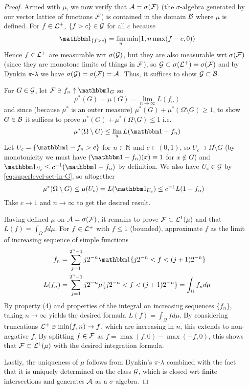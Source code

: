 \begin{proof}
  Armed with $\mu$, we now verify that $\mathcal{A} = \sigma(\mathcal{F})$ (the
  $\sigma$-algebra generated by our vector lattice of functions $\mathcal{F}$)
  is contained in the domain $\mathcal{B}$ where $\mu$ is defined.
  For $f \in \mathcal{L}^+$, $\{f > c\} \in \mathcal{G}$ for all $c$ because
  \begin{align}
    \label{eq:superlevel-set-in-G}
    \ind_{\{f > c\}} = \lim_n \min(1, n \max(f - c, 0))
  \end{align}
  Hence $f \in \mathcal{L}^+$ are measurable wrt $\sigma(\mathcal{G})$, but they are also
  measurable wrt $\sigma(\mathcal{F})$ (since they are monotone limits of things in
  $\mathcal{F}$), so $\mathcal{G} \subset \sigma(\mathcal{L}^+) = \sigma(\mathcal{F})$ and by Dynkin
  $\pi$-$\lambda$ we have $\sigma(\mathcal{G}) = \sigma(\mathcal{F}) = \mathcal{A}$. Thus, it suffices
  to show $\mathcal{G} \subset \mathcal{B}$.

  For $G \in \mathcal{G}$, let $\cF \ni f_n \uparrow \ind_{G}$ so
  \[
    \mu^*(G) = \mu(G) = \lim_{n \to \infty} L(f_n)
  \]
  and since (because $\mu^*$ is an outer measure)
  $\mu^*(G) + \mu^*(\Omega \setminus G) \geq 1$, to show
  $G \in \mathcal{B}$ it suffices to prove $\mu^*(G) + \mu^*(\Omega \setminus G) \leq 1$
  i.e.
  \[
    \mu^*(\Omega \setminus G) \leq \lim_n L(\ind - f_n)
  \]
  Let $U_c = \{\ind - f_n > c\}$ for $n \in \mathbb{N}$ and $c \in (0,1)$,
  so $U_c \supset \Omega \setminus G$
  (by monotonicity we must have $(\ind - f_n)(x) \equiv 1$ for $x \not\in G$)
  and $\ind_{U_c} \leq c^{-1}(\ind - f_n)$ by definition.
  We also have $U_c \in \mathcal{G}$ by \cref{eq:superlevel-set-in-G},
  so altogether
  \begin{align*}
    \mu^*(\Omega \setminus G) \leq \mu(U_c) &= L(\ind_{U_c}) \leq c^{-1} L(1 - f_n)
  \end{align*}
  Take $c \to 1$ and $n \to \infty$ to get the desired result.

  Having defined $\mu$ on $\mathcal{A} = \sigma(\mathcal{F})$, it remains to prove
  $\mathcal{F} \subset \mathcal{L}^1(\mu)$ and that $L(f) = \int_\Omega f d\mu$.
  For $f \in \mathcal{L}^+$ with $f \leq 1$ (bounded), approximate $f$
  as the limit of increasing sequence of simple functions
  \begin{align*}
    f_n &= \sum_{j=1}^{2^n - 1} j 2^{-n} \ind\{j 2^{-n} < f < (j+1) 2^{-n}\} \\
    L(f_n) &= \sum_{j=1}^{2^n - 1} j 2^{-n} \mu\{j 2^{-n} < f < (j+1) 2^{-n}\}
    = \int_\Omega f_n d\mu
  \end{align*}
  By property (4) and properties of the integral on
  increasing sequences $\{f_n\}$, taking $n \to \infty$ yields
  the desired formula $L(f) = \int_\Omega f d\mu$.
  By considering truncations $\mathcal{L}^+ \ni \min(f,n) \to f$,
  which are increasing in $n$, this extends to non-negative $f$.
  By splitting $f \in \mathcal{F}$ as $f = \max(f,0) - \max(-f, 0)$, this
  shows that $\mathcal{F} \subset \mathcal{L}^1(\mu)$ with the desired integration formula.

  Lastly, the uniqueness of $\mu$ follows from Dynkin's $\pi$-$\lambda$
  combined with the fact that it is uniquely determined on the class $\mathcal{G}$,
  which is closed wrt finite intersections and generates $\mathcal{A}$ as a
  $\sigma$-algebra.
\end{proof}
